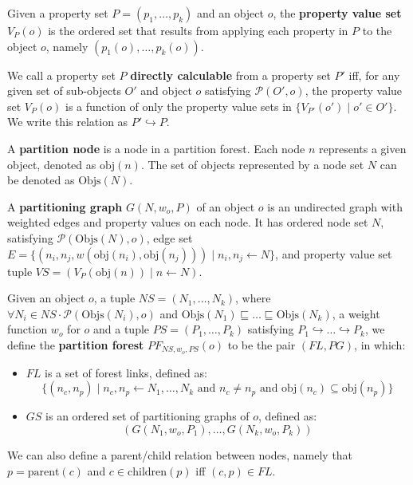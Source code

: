 \begin{definition}
Given a property set $P = (p_1,\ldots,p_k)$ and an object $o$, the \textbf{property value set} $V_P(o)$ is the ordered set that results from applying each property in $P$ to the object $o$, namely $(p_1(o),\ldots,p_k(o))$.
\end{definition}

\begin{definition}
We call a property set $P$ \textbf{directly calculable} from a property set $P'$ iff, for any given set of sub-objects $O'$ and object $o$ satisfying $\mathcal{P}(O',o)$, the property value set $V_P(o)$ is a function of only the property value sets in $\{V_{P'}(o') \; | \; o' \in O'\}$. We write this relation as $P' \hookrightarrow P$.
\end{definition}

\begin{definition}
A \textbf{partition node} is a node in a partition forest. Each node $n$ represents a given object, denoted as $\mbox{obj}(n)$. The set of objects represented by a node set $N$ can be denoted as $\mbox{Objs}(N)$.
\end{definition}

\begin{definition}
A \textbf{partitioning graph} $G(N,w_o,P)$ of an object $o$ is an undirected graph with weighted edges and property values on each node. It has ordered node set $N$, satisfying $\mathcal{P}(\mbox{Objs}(N),o)$, edge set $E = \{(n_i,n_j,w(\mbox{obj}(n_i),\mbox{obj}(n_j))) \; | \; n_i, n_j \leftarrow N\}$, and property value set tuple $VS = (V_P(\mbox{obj}(n)) \; | \; n \leftarrow N)$.
\end{definition}

\begin{definition}
Given an object $o$, a tuple $NS = (N_1,\ldots,N_k)$, where $\forall N_i \in NS \cdot \mathcal{P}(\mbox{Objs}(N_i),o)$ and $\mbox{Objs}(N_1) \sqsubseteq \ldots \sqsubseteq \mbox{Objs}(N_k)$, a weight function $w_o$ for $o$ and a tuple $PS = (P_1,\ldots,P_k)$ satisfying $P_1 \hookrightarrow \ldots \hookrightarrow P_k$, we define the \textbf{partition forest} $PF_{NS,w_o,PS}(o)$ to be the pair $(FL,PG)$, in which:

\begin{itemize}

\item $FL$ is a set of forest links, defined as:
%
\[
\{(n_c,n_p) \; | \; n_c, n_p \leftarrow N_1,\ldots,N_k \mbox{ and } n_c \ne n_p \mbox{ and } \mbox{obj}(n_c) \subseteq \mbox{obj}(n_p)\}
\]

\item $GS$ is an ordered set of partitioning graphs of $o$, defined as:
%
\[
(G(N_1,w_o,P_1),\ldots,G(N_k,w_o,P_k))
\]

\end{itemize}

\noindent We can also define a parent/child relation between nodes, namely that $p = \mbox{parent}(c)$ and $c \in \mbox{children}(p)$ iff $(c,p) \in FL$.

\end{definition}

